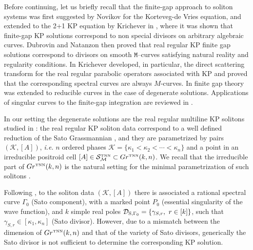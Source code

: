 \documentclass[11pt]{amsart}
\theoremstyle{plain}
\numberwithin{equation}{section}
\def \DS {{\mathcal D}_{\textup{\scriptsize S},\Gamma_0}}
\def \S {{\mathcal S}_{\mathcal M}^{\mbox{\tiny TNN}}}
\begin{document}
Before continuing, let us briefly recall that the finite-gap approach to soliton systems was first suggested by Novikov \cite{Nov} for the Korteveg-de Vries equation, and extended to the 2+1 KP equation by Krichever in \cite{Kr1,Kr2}, where it was shown that finite-gap KP solutions correspond to non special divisors on arbitrary algebraic curves. Dubrovin and Natanzon \cite{DN} then proved that real regular KP finite gap solutions correspond to divisors on smooth $\mathtt M$--curves satisfying natural reality and regularity conditions. In \cite{Kr4} Krichever developed, in particular, the direct scattering transform for the real regular parabolic operators associated with KP and proved that the corresponding spectral curves are always $M$-curves. In \cite{Kr3, KV} finite gap theory was extended to reducible curves in the case of degenerate solutions. Applications of singular curves to the finite-gap integration are reviewed in \cite{Taim}.

In our setting the degenerate solutions are the real regular multiline KP solitons studied in \cite{BPPP,CK,KW1,KW2}: the real regular KP soliton data correspond to a well defined reduction of the Sato Grassmannian \cite{S}, and they are parametrized by pairs $(\mathcal K, [A])$, {\sl i.e.} $n$ ordered phases $\mathcal K =\{ \kappa_1<\kappa_2 <\cdots <\kappa_n\}$ and a point in an irreducible positroid cell $[A]\in \S \subset Gr^{\mbox{\tiny TNN}}(k,n)$. We recall that the irreducible part of $Gr^{\mbox{\tiny TNN}}(k,n)$ is the natural setting for the minimal parametrization of such solitons \cite{CK,KW2}.

Following \cite{Mal}, to the soliton data $(\mathcal K, [A])$ there is associated a rational spectral curve $\Gamma_0$ (Sato component), with a marked point $P_0$ (essential singularity of the wave function), and $k$ simple real poles $\DS =\{ \gamma_{S,r},\  r\in [k] \}$, such that $\gamma_{S,r}\in [\kappa_1,\kappa_n]$ (Sato divisor). However, due to a mismatch between the dimension of $Gr^{\mbox{\tiny TNN}}(k,n)$ and that of the variety of Sato divisors, generically the Sato divisor is not sufficient to determine the corresponding KP solution. 
\end{document}
